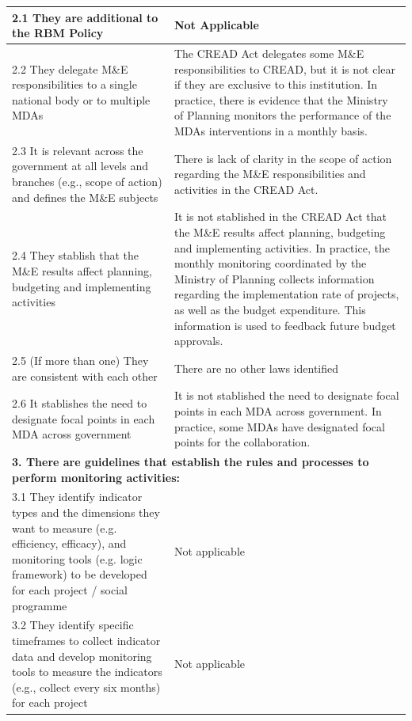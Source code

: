 \documentclass[
  10pt,
]{book}
\begin{document}
\begin{table}
\begin{tabular}[t]{l|l}
\hspace{1em}2.1 They are additional to the RBM Policy & Not Applicable\\
\hline
\hspace{1em}2.2 They delegate M\&E responsibilities to a single national body or to multiple MDAs & The CREAD Act delegates some M\&E responsibilities to CREAD, but it is not clear if they are exclusive to this institution. In practice, there is evidence that the Ministry of Planning monitors the performance of the MDAs interventions in a monthly basis.\\
\hline
\hspace{1em}2.3 It is relevant across the government at all levels and branches (e.g., scope of action) and defines the M\&E subjects & There is lack of clarity in the scope of action regarding the M\&E responsibilities and activities in the CREAD Act.\\
\hline
\hspace{1em}2.4 They stablish that the M\&E results affect planning, budgeting and implementing activities & It is not stablished in the CREAD Act that the M\&E results affect planning, budgeting and implementing activities. In practice, the monthly monitoring coordinated by the Ministry of Planning collects information regarding the implementation rate of projects, as well as the budget expenditure. This information is used to feedback future budget approvals.\\
\hline
\hspace{1em}2.5 (If more than one) They are consistent with each other & There are no other laws identified\\
\hline
\hspace{1em}2.6 It stablishes the need to designate focal points in each MDA across government & It is not stablished the need to designate focal points in each MDA across government. In practice, some MDAs have designated focal points for the collaboration.\\
\hline
\multicolumn{2}{l}{\textbf{3. There are guidelines that establish the rules and processes to perform monitoring activities:}}\\
\hline
\hspace{1em}3.1 They identify indicator types and the dimensions they want to measure (e.g. efficiency, efficacy), and monitoring tools (e.g. logic framework) to be developed for each project / social programme & Not applicable\\
\hline
\hspace{1em}3.2 They identify specific timeframes to collect indicator data and develop monitoring tools to measure the indicators (e.g., collect every six months) for each project & Not applicable\\

\end{tabular}
\end{table}
\end{document}
